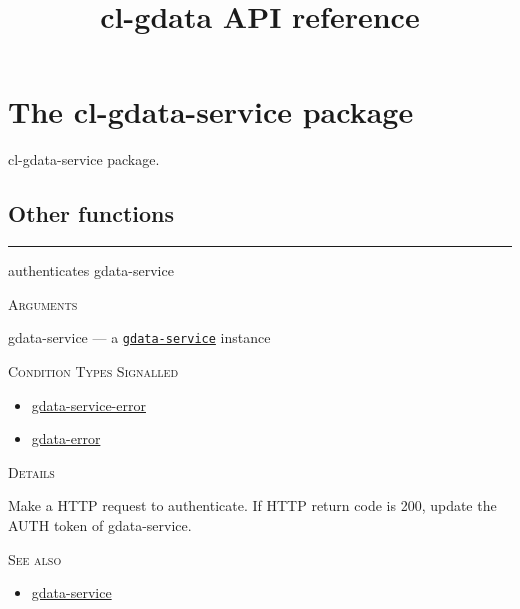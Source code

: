 \documentclass[a4paper]{report}
\begin{document}
    

    \title{cl-gdata API reference}
    \maketitle

    \tableofcontents
    \newpage

    
    \chapter{The cl-gdata-service package}
    cl-gdata-service package.
      \section{Other functions}
      

    \rule{\linewidth}{0.1mm}
    
    \label{cl-gdata-service__fun__authenticates}
    \begin{defun}[Function]
    authenticates gdata-service


    
    \bigskip
    \textsc{Arguments}

gdata-service
	--- a \hyperref[cl-gdata-service__class__gdata-service]{\texttt{gdata-service}}
   instance




      
    \bigskip
    \textsc{Condition Types Signalled}


 	
    \begin{itemize}
    
	  
    \item
    \hyperref[cl-gdata-service__class__gdata-service-error]{gdata-service-error}
    
    \item
    \hyperref[cl-gdata-service__class__gdata-error]{gdata-error}
    
	
    \end{itemize}
  
      


	
    \bigskip
    \textsc{Details}

Make a HTTP request to authenticate.
If HTTP return code is 200, update the AUTH token of gdata-service.


      
    \bigskip
    \textsc{See also}


	
    \begin{itemize}
    
	  
    \item
    \hyperref[cl-gdata-service__class__gdata-service]{gdata-service}
    
	
    \end{itemize}
  
      


    
    \end{defun}
  
\end{document}
